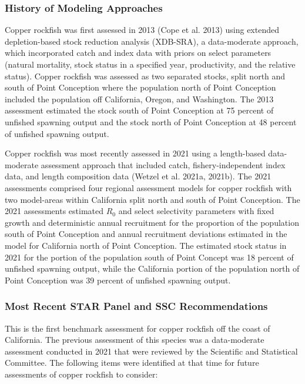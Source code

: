\documentclass[11pt,
  english,
  letterpaper,
]{article}
\begin{document}
\hypertarget{history-of-modeling-approaches}{%
\subsubsection{History of Modeling Approaches}\label{history-of-modeling-approaches}}

Copper rockfish was first assessed in 2013 (Cope et al. 2013) using extended depletion-based stock reduction analysis (XDB-SRA), a data-moderate approach, which incorporated catch and index data with priors on select parameters (natural mortality, stock status in a specified year, productivity, and the relative status). Copper rockfish was assessed as two separated stocks, split north and south of Point Conception where the population north of Point Conception included the population off California, Oregon, and Washington. The 2013 assessment estimated the stock south of Point Conception at 75 percent of unfished spawning output and the stock north of Point Conception at 48 percent of unfished spawning output.

Copper rockfish was most recently assessed in 2021 using a length-based data-moderate assessment approach that included catch, fishery-independent index data, and length composition data (Wetzel et al. 2021a, 2021b). The 2021 assessments comprised four regional assessment models for copper rockfish with two model-areas within California split north and south of Point Conception. The 2021 assessments estimated \(R_0\) and select selectivity parameters with fixed growth and deterministic annual recruitment for the proportion of the population south of Point Conception and annual recruitment deviations estimated in the model for California north of Point Conception. The estimated stock status in 2021 for the portion of the population south of Point Concept was 18 percent of unfished spawning output, while the California portion of the population north of Point Conception was 39 percent of unfished spawning output.

\hypertarget{most-recent-star-panel-and-ssc-recommendations}{%
\subsubsection{Most Recent STAR Panel and SSC Recommendations}\label{most-recent-star-panel-and-ssc-recommendations}}

This is the first benchmark assessment for copper rockfish off the coast of California. The previous assessment of this species was a data-moderate assessment conducted in 2021 that were reviewed by the Scientific and Statistical Committee. The following items were identified at that time for future assessments of copper rockfish to consider:
\end{document}
